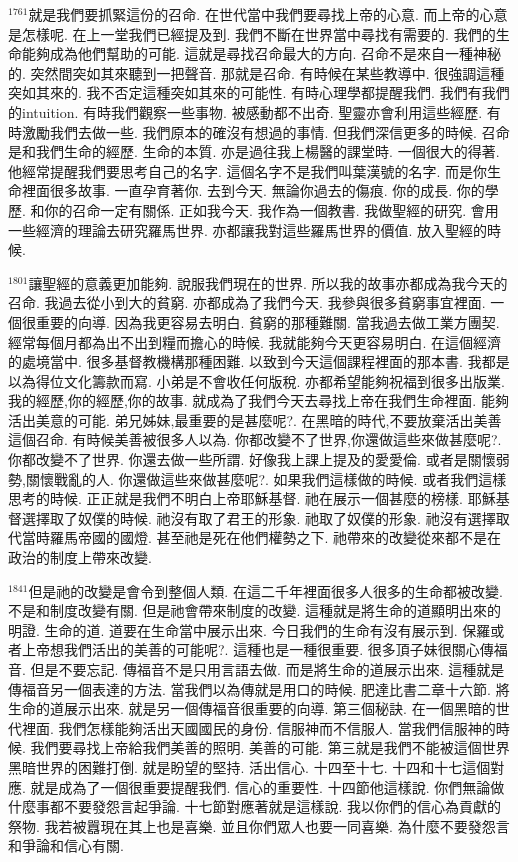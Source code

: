 \documentclass{book}
\begin{document}
$^{1761}$就是我們要抓緊這份的召命.
在世代當中我們要尋找上帝的心意.
而上帝的心意是怎樣呢.
在上一堂我們已經提及到.
我們不斷在世界當中尋找有需要的.
我們的生命能夠成為他們幫助的可能.
這就是尋找召命最大的方向.
召命不是來自一種神秘的.
突然間突如其來聽到一把聲音.
那就是召命.
有時候在某些教導中.
很強調這種突如其來的.
我不否定這種突如其來的可能性.
有時心理學都提醒我們.
我們有我們的intuition.
有時我們觀察一些事物.
被感動都不出奇.
聖靈亦會利用這些經歷.
有時激勵我們去做一些.
我們原本的確沒有想過的事情.
但我們深信更多的時候.
召命是和我們生命的經歷.
生命的本質.
亦是過往我上楊醫的課堂時.
一個很大的得著.
他經常提醒我們要思考自己的名字.
這個名字不是我們叫葉漢號的名字.
而是你生命裡面很多故事.
一直孕育著你.
去到今天.
無論你過去的傷痕.
你的成長.
你的學歷.
和你的召命一定有關係.
正如我今天.
我作為一個教書.
我做聖經的研究.
會用一些經濟的理論去研究羅馬世界.
亦都讓我對這些羅馬世界的價值.
放入聖經的時候.

$^{1801}$讓聖經的意義更加能夠.
說服我們現在的世界.
所以我的故事亦都成為我今天的召命.
我過去從小到大的貧窮.
亦都成為了我們今天.
我參與很多貧窮事宜裡面.
一個很重要的向導.
因為我更容易去明白.
貧窮的那種難關.
當我過去做工業方團契.
經常每個月都為出不出到糧而擔心的時候.
我就能夠今天更容易明白.
在這個經濟的處境當中.
很多基督教機構那種困難.
以致到今天這個課程裡面的那本書.
我都是以為得位文化籌款而寫.
小弟是不會收任何版稅.
亦都希望能夠祝福到很多出版業.
我的經歷,你的經歷,你的故事.
就成為了我們今天去尋找上帝在我們生命裡面.
能夠活出美意的可能.
弟兄姊妹,最重要的是甚麼呢?.
在黑暗的時代,不要放棄活出美善這個召命.
有時候美善被很多人以為.
你都改變不了世界,你還做這些來做甚麼呢?.
你都改變不了世界.
你還去做一些所謂.
好像我上課上提及的愛愛倫.
或者是關懷弱勢,關懷戰亂的人.
你還做這些來做甚麼呢?.
如果我們這樣做的時候.
或者我們這樣思考的時候.
正正就是我們不明白上帝耶穌基督.
祂在展示一個甚麼的榜樣.
耶穌基督選擇取了奴僕的時候.
祂沒有取了君王的形象.
祂取了奴僕的形象.
祂沒有選擇取代當時羅馬帝國的國燈.
甚至祂是死在他們權勢之下.
祂帶來的改變從來都不是在政治的制度上帶來改變.

$^{1841}$但是祂的改變是會令到整個人類.
在這二千年裡面很多人很多的生命都被改變.
不是和制度改變有關.
但是祂會帶來制度的改變.
這種就是將生命的道顯明出來的明證.
生命的道.
道要在生命當中展示出來.
今日我們的生命有沒有展示到.
保羅或者上帝想我們活出的美善的可能呢?.
這種也是一種很重要.
很多頂子妹很關心傳福音.
但是不要忘記.
傳福音不是只用言語去做.
而是將生命的道展示出來.
這種就是傳福音另一個表達的方法.
當我們以為傳就是用口的時候.
肥達比書二章十六節.
將生命的道展示出來.
就是另一個傳福音很重要的向導.
第三個秘訣.
在一個黑暗的世代裡面.
我們怎樣能夠活出天國國民的身份.
信服神而不信服人.
當我們信服神的時候.
我們要尋找上帝給我們美善的照明.
美善的可能.
第三就是我們不能被這個世界黑暗世界的困難打倒.
就是盼望的堅持.
活出信心.
十四至十七.
十四和十七這個對應.
就是成為了一個很重要提醒我們.
信心的重要性.
十四節他這樣說.
你們無論做什麼事都不要發怨言起爭論.
十七節對應著就是這樣說.
我以你們的信心為貢獻的祭物.
我若被囂現在其上也是喜樂.
並且你們眾人也要一同喜樂.
為什麼不要發怨言和爭論和信心有關.
\end{document}
